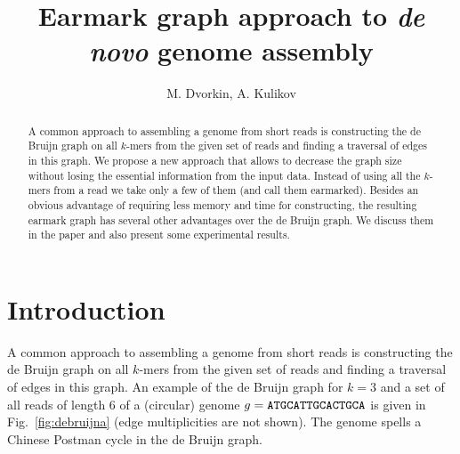 \documentclass[12pt]{article}
\begin{document}

\author{M. Dvorkin, A. Kulikov}
\title{Earmark graph approach to {\it de novo} genome assembly}
\maketitle

\begin{abstract}
A common approach to assembling a genome from short reads is constructing
the de Bruijn graph on all $k$-mers from the given set of reads and finding a traversal of edges
in this graph. We propose a new approach that allows to decrease
the graph size without losing the essential information from the input data.
Instead of using all the $k$-mers from a read we take only a few of them
(and call them earmarked). Besides an obvious advantage of requiring less memory 
and time for constructing, the resulting earmark graph has several other advantages over the
de Bruijn graph. We discuss them in the paper and also present some experimental results.
\end{abstract}

\tableofcontents


\section{Introduction}
A common approach to assembling a genome from short reads is constructing
the de Bruijn graph \cite{PW01} on all $k$-mers from the given set of 
reads and finding a traversal of edges in this graph.
An example of the de Bruijn graph for $k=3$ and a set of all reads of length $6$
of a (circular) genome $g={\tt ATGCATTGCACTGCA}$ is given in 
Fig.~\ref{fig:debruijna}
(edge multiplicities are not shown). The genome spells a Chinese Postman
cycle in the de Bruijn graph.
\end{document}
